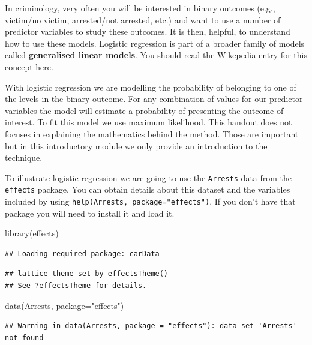 \documentclass[
]{book}
\newenvironment{Shaded}{\begin{snugshade}}{\end{snugshade}}
\newcommand{\AttributeTok}[1]{\textcolor[rgb]{0.77,0.63,0.00}{#1}}
\newcommand{\FunctionTok}[1]{\textcolor[rgb]{0.00,0.00,0.00}{#1}}
\newcommand{\NormalTok}[1]{#1}
\newcommand{\StringTok}[1]{\textcolor[rgb]{0.31,0.60,0.02}{#1}}
\begin{document}
In criminology, very often you will be interested in binary outcomes (e.g., victim/no victim, arrested/not arrested, etc.) and want to use a number of predictor variables to study these outcomes. It is then, helpful, to understand how to use these models. Logistic regression is part of a broader family of models called \textbf{generalised linear models}. You should read the Wikepedia entry for this concept \href{https://en.wikipedia.org/wiki/Generalized_linear_model}{here}.

With logistic regression we are modelling the probability of belonging to one of the levels in the binary outcome. For any combination of values for our predictor variables the model will estimate a probability of presenting the outcome of interest. To fit this model we use maximum likelihood. This handout does not focuses in explaining the mathematics behind the method. Those are important but in this introductory module we only provide an introduction to the technique.

To illustrate logistic regression we are going to use the \texttt{Arrests} data from the \texttt{effects} package. You can obtain details about this dataset and the variables included by using \texttt{help(Arrests,\ package="effects")}. If you don't have that package you will need to install it and load it.

\begin{Shaded}
\begin{Highlighting}[]
\FunctionTok{library}\NormalTok{(effects)}
\end{Highlighting}
\end{Shaded}

\begin{verbatim}
## Loading required package: carData
\end{verbatim}

\begin{verbatim}
## lattice theme set by effectsTheme()
## See ?effectsTheme for details.
\end{verbatim}

\begin{Shaded}
\begin{Highlighting}[]
\FunctionTok{data}\NormalTok{(Arrests, }\AttributeTok{package=}\StringTok{"effects"}\NormalTok{)}
\end{Highlighting}
\end{Shaded}

\begin{verbatim}
## Warning in data(Arrests, package = "effects"): data set 'Arrests' not found
\end{verbatim}
\end{document}
